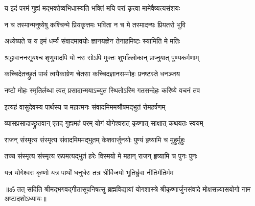 \twolineshloka
{य इदं परमं गुह्यं मद्भक्तेष्वभिधास्यति}
{भक्तिं मयि परां कृत्वा मामेवैष्यत्यसंशयः}%

\twolineshloka
{न च तस्मान्मनुष्येषु कश्चिन्मे प्रियकृत्तमः}
{भविता न च मे तस्मादन्यः प्रियतरो भुवि}%

\twolineshloka
{अध्येष्यते च य इमं धर्म्यं संवादमावयोः}
{ज्ञानयज्ञेन तेनाहमिष्टः स्यामिति मे मतिः}%

\twolineshloka
{श्रद्धावाननसूयश्च शृणुयादपि यो नरः}
{सोऽपि मुक्तः शुभाँल्लोकान् प्राप्नुयात् पुण्यकर्मणाम्}%

\twolineshloka
{कच्चिदेतच्छ्रुतं पार्थ त्वयैकाग्रेण चेतसा}
{कच्चिदज्ञानसम्मोहः प्रनष्टस्ते धनञ्जय}%


\twolineshloka
{नष्टो मोहः स्मृतिर्लब्धा त्वत् प्रसादान्मयाऽच्युत}
{स्थितोऽस्मि गतसन्देहः करिष्ये वचनं तव}%


\twolineshloka
{इत्यहं वासुदेवस्य पार्थस्य च महात्मनः}
{संवादमिममश्रौषमद्भुतं रोमहर्षणम्}%

\twolineshloka
{व्यासप्रसादाच्छ्रुतवान् एतद् गुह्यमहं परम्}
{योगं योगेश्वरात् कृष्णात् साक्षात् कथयतः स्वयम्}%

\twolineshloka
{राजन् संस्मृत्य संस्मृत्य संवादमिममद्भुतम्}
{केशवार्जुनयोः पुण्यं हृष्यामि च मुहुर्मुहुः}%

\twolineshloka
{तच्च संस्मृत्य संस्मृत्य रूपमत्यद्भुतं हरेः}
{विस्मयो मे महान् राजन् हृष्यामि च पुनः पुनः}%

\twolineshloka
{यत्र योगेश्वरः कृष्णो यत्र पार्थो धनुर्धरः}
{तत्र श्रीर्विजयो भूतिर्ध्रुवा नीतिर्मतिर्मम}%

{॥ॐ तत् सदिति श्रीमद्भगवद्गीतासूपनिषत्सु ब्रह्मविद्यायां योगशास्त्रे श्रीकृष्णार्जुनसंवादे मोक्षसन्न्यासयोगो नाम अष्टादशोऽध्यायः॥}
